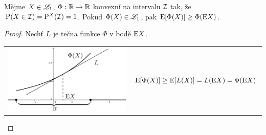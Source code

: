 \begin{theorem}
	Mějme $X\in\mathscr{L}_1$, $\Phi:\mathbb{R}\to\mathbb{R}$ konvexní na intervalu $\mathcal{I}$ tak, že $\mathrm{P}(X\in \mathcal{I})=\mathrm{P}^X(\mathcal{I})=1$. Pokud $\Phi(X)\in\mathscr{L}_1$, pak $\mathrm{E} [\Phi(X)]\geq \Phi(\mathrm{E} X)$.\begin{proof}
		Nechť $L$ je tečna funkce $\Phi$ v bodě $\mathrm{E} X$.\newline
			\begin{tabular}{m{8cm} m{8cm}}
			\includegraphics[width=8cm]{tecna} & $ \mathrm{E} [\Phi(X)]\geq \mathrm{E} [L(X)]=L(\mathrm{E} X)=\Phi(\mathrm{E} X)$ 
			\end{tabular} 
	\end{proof}
\end{theorem}

